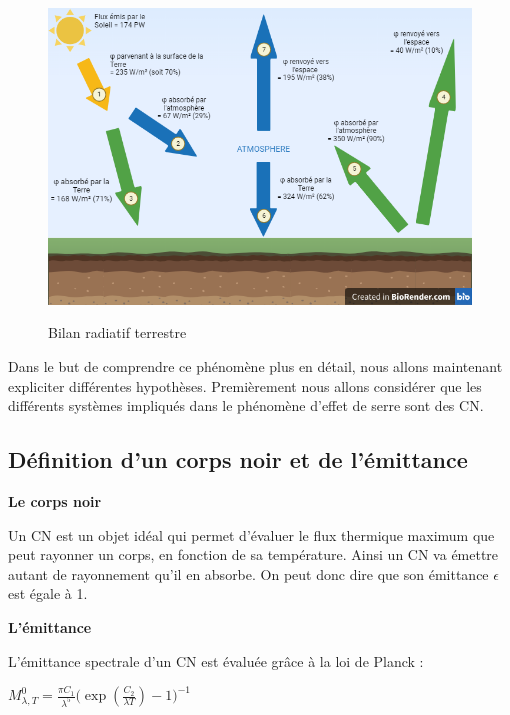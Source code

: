 \documentclass[a4paper, 12pt]{report} %
\newcommand{\figcaptionwithsource}[3]{\caption[#1 
            \newline #2]{#1} \addtocontents{lof}{\protect\vspace{1\baselineskip}}}
\begin{document}
\begin{figure}[h]
    \begin{center}
    \includegraphics[scale=0.5]{Images/schemaflux.png}
    \figcaptionwithsource{Bilan radiatif terrestre}{\textit{Biorender}}{fig:figure1}
    \label{fig:figure1}
    \end{center} 
\end{figure}

Dans le but de comprendre ce phénomène plus en détail, nous allons maintenant expliciter 
différentes hypothèses. Premièrement nous allons considérer que les différents systèmes impliqués 
dans le phénomène d’effet de serre sont des CN. 

\subsection{Définition d'un corps noir et de l'émittance}
\noindent \textbf{Le corps noir}

\vspace{\baselineskip}
Un CN est un objet idéal qui permet d'évaluer le flux thermique maximum
que peut rayonner un corps, en fonction de sa température. Ainsi un CN 
va émettre autant de rayonnement qu'il en absorbe. On peut donc dire que son 
émittance $ \epsilon$  est égale à 1. \vspace{\baselineskip}

\noindent \textbf{L'émittance}
\vspace{\baselineskip}

\noindent L'émittance spectrale d'un CN est évaluée grâce à la loi de Planck :

\begin{center}
$M^{0}_{\lambda,T}= \frac{\pi C_1}{\lambda^5} \biggl(\exp(\frac{C_2}{\lambda T}) - 1\biggr)^{-1}$ \\
\end{center}
\end{document}
